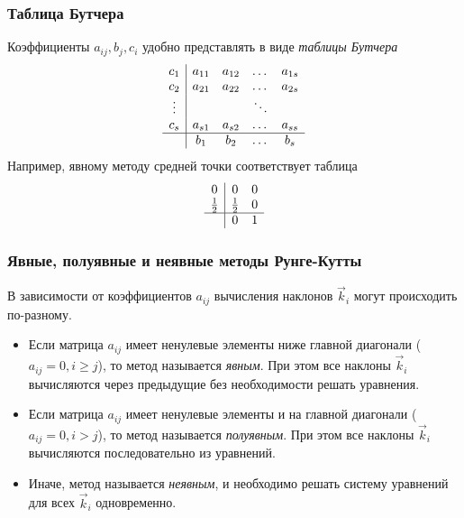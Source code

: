 \documentclass[professionalfonts,compress,unicode,aspectratio=169]{beamer}
\begin{document}
\begin{frame}\frametitle{Таблица Бутчера}
	Коэффициенты $a_{ij}, b_j, c_i$ удобно представлять в виде \emph{таблицы Бутчера}
	\begin{equation*}
	\begin{array}{c|cccccc}
	c_1 & a_{11} & a_{12} & \dots & a_{1s}\\
	c_2 & a_{21} & a_{22} & \dots & a_{2s}\\
	\vdots & & & \ddots & \\
	c_s & a_{s1} & a_{s2} & \dots & a_{ss}\\
	\hline
	& b_1 & b_2 & \dots & b_s
	\end{array}
	\end{equation*}
	\pause
	Например, явному методу средней точки соответствует таблица
	\begin{equation*}
	\begin{array}{c|cccccc}
	0 & 0 & 0\\
	\frac{1}{2} & \frac{1}{2} & 0\\
	\hline
	& 0 & 1
	\end{array}
	\end{equation*}
\end{frame}

\begin{frame}\frametitle{Явные, полуявные и неявные методы Рунге-Кутты}
	В зависимости от коэффициентов $a_{ij}$ вычисления наклонов $\vec k_i$ могут
	происходить по-разному.

	\begin{itemize}
	\item
	Если матрица $a_{ij}$ имеет ненулевые элементы ниже главной диагонали ($a_{ij} = 0, i\geq j$),
	то метод называется \emph{явным}. При этом все наклоны $\vec k_i$ вычисляются через предыдущие без необходимости
	решать уравнения.

	\item
	Если матрица $a_{ij}$ имеет ненулевые элементы и на главной диагонали ($a_{ij} = 0, i > j$),
	то метод называется \emph{полуявным}. При этом все наклоны $\vec k_i$ вычисляются последовательно из уравнений.

	\item
	Иначе, метод называется \emph{неявным}, и необходимо решать систему
уравнений для всех $\vec k_i$ одновременно.
	\end{itemize}
\end{frame}
\end{document}
